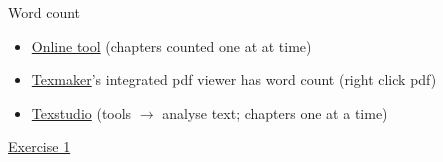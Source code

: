 \begin{frame}{Word count}
  \begin{itemize}
    \item \href{http://app.uio.no/ifi/texcount/online.php}{Online tool}
      (chapters counted one at at time)
    \item \href{http://www.xm1math.net/texmaker/}{Texmaker}'s integrated pdf
       viewer has word count (right click pdf)
    \item \href{https://www.texstudio.org/}{Texstudio} (tools $\rightarrow$
      analyse text; chapters one at a time)
  \end{itemize}
\end{frame}

\begin{frame}[standout]
  \href{https://jwalton.info/assets/teaching/latex/exercise_1.pdf}%
  {\color{white}Exercise 1}
\end{frame}
